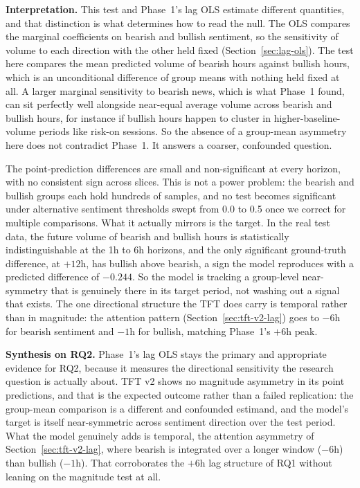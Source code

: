 \textbf{Interpretation.} This test and Phase~1's lag OLS estimate different quantities, and that distinction is what determines how to read the null. The OLS compares the marginal coefficients on bearish and bullish sentiment, so the sensitivity of volume to each direction with the other held fixed (Section~\ref{sec:lag-ols}). The test here compares the mean predicted volume of bearish hours against bullish hours, which is an unconditional difference of group means with nothing held fixed at all. A larger marginal sensitivity to bearish news, which is what Phase~1 found, can sit perfectly well alongside near-equal average volume across bearish and bullish hours, for instance if bullish hours happen to cluster in higher-baseline-volume periods like risk-on sessions. So the absence of a group-mean asymmetry here does not contradict Phase~1. It answers a coarser, confounded question.

The point-prediction differences are small and non-significant at every horizon, with no consistent sign across slices. This is not a power problem: the bearish and bullish groups each hold hundreds of samples, and no test becomes significant under alternative sentiment thresholds swept from 0.0 to 0.5 once we correct for multiple comparisons. What it actually mirrors is the target. In the real test data, the future volume of bearish and bullish hours is statistically indistinguishable at the 1h to 6h horizons, and the only significant ground-truth difference, at $+12$h, has bullish above bearish, a sign the model reproduces with a predicted difference of $-0.244$. So the model is tracking a group-level near-symmetry that is genuinely there in its target period, not washing out a signal that exists. The one directional structure the TFT does carry is temporal rather than in magnitude: the attention pattern (Section~\ref{sec:tft-v2-lag}) goes to $-6$h for bearish sentiment and $-1$h for bullish, matching Phase~1's $+6$h peak.

\textbf{Synthesis on RQ2.} Phase~1's lag OLS stays the primary and appropriate evidence for RQ2, because it measures the directional sensitivity the research question is actually about. TFT v2 shows no magnitude asymmetry in its point predictions, and that is the expected outcome rather than a failed replication: the group-mean comparison is a different and confounded estimand, and the model's target is itself near-symmetric across sentiment direction over the test period. What the model genuinely adds is temporal, the attention asymmetry of Section~\ref{sec:tft-v2-lag}, where bearish is integrated over a longer window ($-6$h) than bullish ($-1$h). That corroborates the $+6$h lag structure of RQ1 without leaning on the magnitude test at all.

